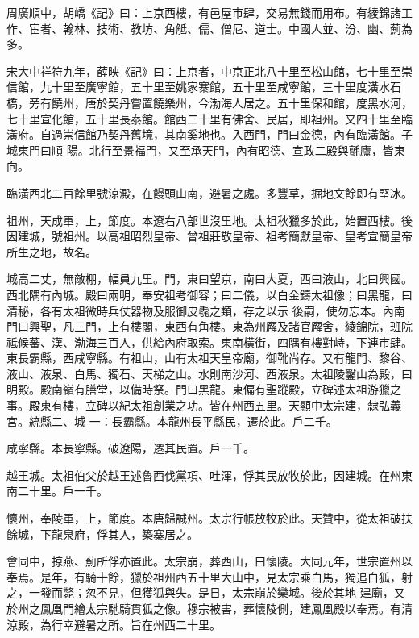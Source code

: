 \begin{pinyinscope}
 周廣順中，胡嶠《記》曰：上京西樓，有邑屋市肆，交易無錢而用布。有綾錦諸工作、宦者、翰林、技術、教坊、角觝、儒、僧尼、道士。中國人並、汾、幽、薊為多。



 宋大中祥符九年，薛映《記》曰：上京者，中京正北八十里至松山館，七十里至崇信館，九十里至廣寧館，五十里至姚家寨館，五十里至咸寧館，三十里度潢水石橋，旁有饒州，唐於契丹嘗置饒樂州，今渤海人居之。五十里保和館，度黑水河，七十里宣化館，五十里長泰館。館西二十里有佛舍、民居，即祖州。又四十里至臨潢府。自過崇信館乃契丹舊境，其南奚地也。入西門，門曰金德，內有臨潢館。子城東門曰順
 陽。北行至景福門，又至承天門，內有昭德、宣政二殿與氈廬，皆東向。



 臨潢西北二百餘里號涼澱，在饅頭山南，避暑之處。多豐草，掘地文餘即有堅冰。



 祖州，天成軍，上，節度。本遼右八部世沒里地。太祖秋獵多於此，始置西樓。後因建城，號祖州。以高祖昭烈皇帝、曾祖莊敬皇帝、祖考簡獻皇帝、皇考宣簡皇帝所生之地，故名。



 城高二丈，無敵棚，幅員九里。門，東曰望京，南曰大夏，西曰液山，北曰興國。西北隅有內城。殿曰兩明，奉安祖考御容；曰二儀，以白金鑄太祖像；曰黑龍，曰清秘，各有太祖微時兵仗器物及服御皮毳之類，存之以示
 後嗣，使勿忘本。內南門曰興聖，凡三門，上有樓閣，東西有角樓。東為州廨及諸官廨舍，綾錦院，班院祗候蕃、漢、渤海三百人，供給內府取索。東南橫街，四隅有樓對峙，下連市肆。東長霸縣，西咸寧縣。有祖山，山有太祖天皇帝廟，御靴尚存。又有龍門、黎谷、液山、液泉、白馬、獨石、天梯之山。水則南沙河、西液泉。太祖陵鑿山為殿，曰明殿。殿南嶺有膳堂，以備時祭。門曰黑龍。東偏有聖蹤殿，立碑述太祖游獵之事。殿東有樓，立碑以紀太祖創業之功。皆在州西五里。天顯中太宗建，隸弘義宮。統縣二、城
 一：長霸縣。本龍州長平縣民，遷於此。戶二千。



 咸寧縣。本長寧縣。破遼陽，遷其民置。戶一千。



 越王城。太祖伯父於越王述魯西伐黨項、吐渾，俘其民放牧於此，因建城。在州東南二十里。戶一千。



 懷州，奉陵軍，上，節度。本唐歸誠州。太宗行帳放牧於此。天贊中，從太祖破扶餘城，下龍泉府，俘其人，築寨居之。



 會同中，掠燕、薊所俘亦置此。太宗崩，葬西山，曰懷陵。大同元年，世宗置州以奉焉。是年，有騎十餘，獵於祖州西五十里大山中，見太宗乘白馬，獨追白狐，射之，一發而斃；忽不見，但獲狐與失。是日，太宗崩於欒城。後於其地
 建廟，又於州之鳳凰門繪太宗馳騎貫狐之像。穆宗被害，葬懷陵側，建鳳凰殿以奉焉。有清涼殿，為行幸避暑之所。旨在州西二十里。




\end{pinyinscope}

